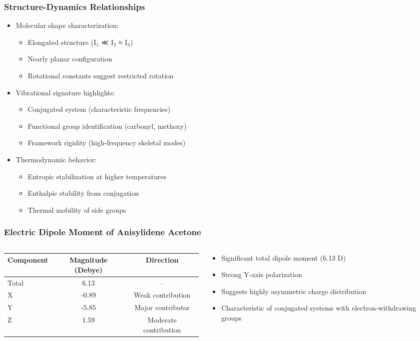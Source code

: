 \documentclass[aspectratio=169, 9pt]{beamer}
\begin{document}
\begin{frame}
\frametitle{Structure-Dynamics Relationships}
\begin{itemize}
\item Molecular shape characterization:
  \begin{itemize}
  \item Elongated structure (I$_1$ ≪ I$_2$ ≈ I$_3$)
  \item Nearly planar configuration
  \item Rotational constants suggest restricted rotation
  \end{itemize}
\item Vibrational signature highlights:
  \begin{itemize}
  \item Conjugated system (characteristic frequencies)
  \item Functional group identification (carbonyl, methoxy)
  \item Framework rigidity (high-frequency skeletal modes)
  \end{itemize}
\item Thermodynamic behavior:
  \begin{itemize}
  \item Entropic stabilization at higher temperatures
  \item Enthalpic stability from conjugation
  \item Thermal mobility of side groups
  \end{itemize}
\end{itemize}
\end{frame}
\begin{frame}
\frametitle{Electric Dipole Moment of Anisylidene Acetone}
\begin{columns}
\begin{column}{0.6\textwidth}
\begin{center}
\begin{tabular}{|l|c|c|}
\hline
\textbf{Component} & \textbf{Magnitude (Debye)} & \textbf{Direction} \\
\hline
Total & 6.13 & -- \\
\hline
X & -0.89 & Weak contribution \\
\hline
Y & -5.85 & Major contributor \\
\hline
Z & 1.59 & Moderate contribution \\
\hline
\end{tabular}
\end{center}
\end{column}
\begin{column}{0.4\textwidth}
\begin{itemize}
\item Significant total dipole moment (6.13 D)
\item Strong Y-axis polarization
\item Suggests highly asymmetric charge distribution
\item Characteristic of conjugated systems with electron-withdrawing groups
\end{itemize}
\end{column}
\end{columns}
\end{frame}
\end{document}
